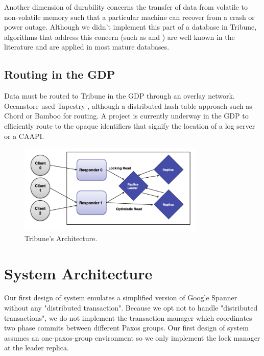 \documentclass[10pt,twocolumn]{article}
\begin{document}
Another dimension of durability concerns the transfer of data from volatile to non-volatile memory such that a particular machine can recover from a crash or power outage. Although we didn't implement this part of a database in Tribune, algorithms that address this concern (such as \cite{mohan_aries:_1992} and \cite{sears_segment-based_2009} ) are well known in the literature and are applied in most mature databases.

\subsection{Routing in the GDP}
Data must be routed to Tribune in the GDP through an overlay network. Oceanstore used Tapestry \cite{zhao_tapestry_2004}, although a distributed hash table approach such as Chord \cite{stoica_chord:_2003} or Bamboo \cite{rhea_handling_2003} for routing. A project is currently underway in the GDP to efficiently route to the opaque identifiers that signify the location of a log server or a CAAPI.

\begin{figure}[!b]
  \begin{center}
    \includegraphics[width=3.5in]{Images/Tribune_Arch.png}
  \end{center}

  \caption{\small Tribune's Architecture. }
  \label{Tribune_Arch}
\end{figure}


\section{System Architecture}
Our first design of system emulates a simplified version of Google Spanner without any "distributed transaction". Because we opt not to handle "distributed transactions", we do not implement the transaction manager which coordinates two phase commits between different Paxos groups. Our first design of system assumes an one-paxos-group environment so we only implement the lock manager at the leader replica.
\end{document}
